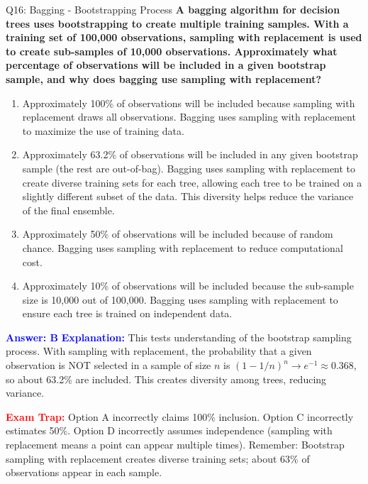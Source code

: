 \documentclass[8pt]{beamer}
\begin{document}
	\begin{frame}{Q16: Bagging - Bootstrapping Process}
		\fontsize{6.5}{7.5}\selectfont
		\textbf{A bagging algorithm for decision trees uses bootstrapping to create multiple training samples. With a training set of 100,000 observations, sampling with replacement is used to create sub-samples of 10,000 observations. Approximately what percentage of observations will be included in a given bootstrap sample, and why does bagging use sampling with replacement?}
		
		\begin{enumerate}
			\item Approximately 100\% of observations will be included because sampling with replacement draws all observations. Bagging uses sampling with replacement to maximize the use of training data.
			\item Approximately 63.2\% of observations will be included in any given bootstrap sample (the rest are out-of-bag). Bagging uses sampling with replacement to create diverse training sets for each tree, allowing each tree to be trained on a slightly different subset of the data. This diversity helps reduce the variance of the final ensemble.
			\item Approximately 50\% of observations will be included because of random chance. Bagging uses sampling with replacement to reduce computational cost.
			\item Approximately 10\% of observations will be included because the sub-sample size is 10,000 out of 100,000. Bagging uses sampling with replacement to ensure each tree is trained on independent data.
		\end{enumerate}
		
		\vspace{0.1cm}
		\textcolor{blue}{\textbf{Answer: B}}
		\vspace{0.1cm}
		\textcolor{blue}{\textbf{Explanation:}} This tests understanding of the bootstrap sampling process. With sampling with replacement, the probability that a given observation is NOT selected in a sample of size $n$ is $(1 - 1/n)^n \rightarrow e^{-1} \approx 0.368$, so about 63.2\% are included. This creates diversity among trees, reducing variance.
		
		\textcolor{red}{\textbf{Exam Trap:}} Option A incorrectly claims 100\% inclusion. Option C incorrectly estimates 50\%. Option D incorrectly assumes independence (sampling with replacement means a point can appear multiple times). Remember: Bootstrap sampling with replacement creates diverse training sets; about 63\% of observations appear in each sample.
	\end{frame}
	
\end{document}
